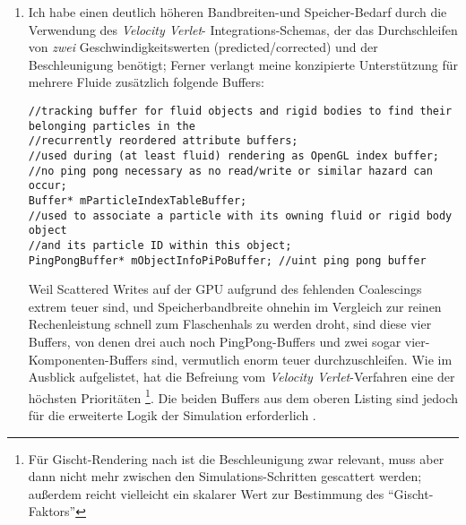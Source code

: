 \begin{enumerate}
		
		\item Ich habe einen deutlich höheren Bandbreiten-und Speicher-Bedarf durch die Verwendung des 
		\emph{Velocity Verlet}- Integrations-Schemas, der das Durchschleifen von \emph{zwei} Geschwindigkeitswerten
		(predicted/corrected) und der Beschleunigung benötigt; Ferner verlangt meine konzipierte
		Unterstützung für mehrere Fluide zusätzlich folgende  Buffers:
		\begin{lstlisting}
//tracking buffer for fluid objects and rigid bodies to find their belonging particles in the
//recurrently reordered attribute buffers;
//used during (at least fluid) rendering as OpenGL index buffer;
//no ping pong necessary as no read/write or similar hazard can occur;
Buffer* mParticleIndexTableBuffer;
//used to associate a particle with its owning fluid or rigid body object
//and its particle ID within this object;
PingPongBuffer* mObjectInfoPiPoBuffer; //uint ping pong buffer	
		\end{lstlisting}
		Weil Scattered Writes auf der GPU aufgrund des fehlenden Coalescings extrem teuer sind,
		und Speicherbandbreite ohnehin im Vergleich zur reinen Rechenleistung schnell zum Flaschenhals
		zu werden droht, sind diese vier Buffers, von denen drei auch noch PingPong-Buffers und zwei
		sogar vier-Komponenten-Buffers sind, vermutlich enorm teuer durchzuschleifen. Wie im Ausblick
		aufgelistet, hat die Befreiung vom \emph{Velocity Verlet}-Verfahren eine der höchsten 
		Prioritäten \footnote{Für Gischt-Rendering nach \cite{Green2009FluidRenderingCurvatureFlow} ist die 
		Beschleunigung zwar relevant, muss aber dann nicht mehr zwischen den Simulations-Schritten gescattert
		werden; außerdem reicht vielleicht ein skalarer Wert zur Bestimmung des "`Gischt-Faktors"'}.
		Die beiden Buffers aus dem oberen Listing sind jedoch für die erweiterte Logik der Simulation erforderlich .
		

\end{enumerate}
